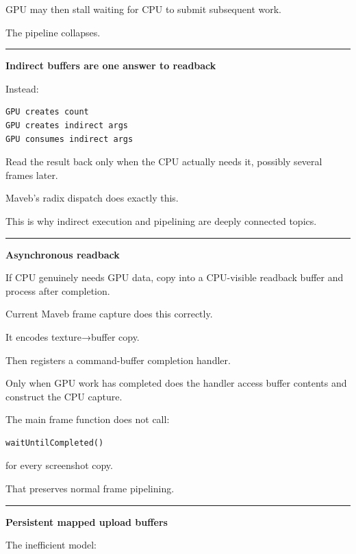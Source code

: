 GPU may then stall waiting for CPU to submit subsequent work.

The pipeline collapses.

\begin{center}\rule{0.5\linewidth}{0.5pt}\end{center}

\textbf{Indirect buffers are one answer to readback}

Instead:

\protect{}\label{p10-gpu-chain}%
\begin{verbatim}
GPU creates count
GPU creates indirect args
GPU consumes indirect args
\end{verbatim}

Read the result back only when the CPU actually needs it, possibly several frames later.

Maveb's radix dispatch does exactly this.

This is why indirect execution and pipelining are deeply connected topics.

\begin{center}\rule{0.5\linewidth}{0.5pt}\end{center}

\textbf{Asynchronous readback}

If CPU genuinely needs GPU data, copy into a CPU-visible readback buffer and process after completion.

Current Maveb frame capture does this correctly.

It encodes texture→buffer copy.

Then registers a command-buffer completion handler.

Only when GPU work has completed does the handler access buffer contents and construct the CPU capture.

The main frame function does not call:

\protect{}\label{p10-no-wait}%
\begin{verbatim}
waitUntilCompleted()
\end{verbatim}

for every screenshot copy.

That preserves normal frame pipelining.

\begin{center}\rule{0.5\linewidth}{0.5pt}\end{center}

\textbf{Persistent mapped upload buffers}

The inefficient model:

